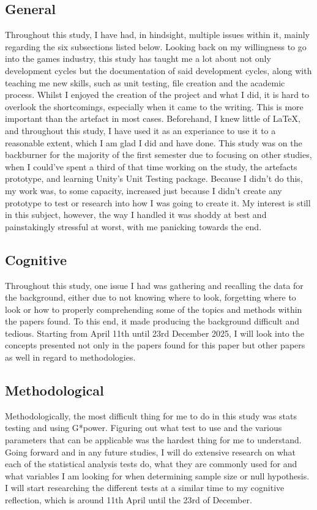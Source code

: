 \documentclass[conference]{IEEEtran}
\begin{document}
\subsection{General}
Throughout this study, I have had, in hindsight, multiple issues within it, mainly regarding the six subsections listed below. Looking back on my willingness to go into the games industry, this study has taught me a lot about not only development cycles but the documentation of said development cycles, along with teaching me new skills, such as unit testing, file creation and the academic process. Whilst I enjoyed the creation of the project and what I did, it is hard to overlook the shortcomings, especially when it came to the writing. This is more important than the artefact in most cases. Beforehand, I knew little of \LaTeX, and throughout this study, I have used it as an experiance to use it to a reasonable extent, which I am glad I did and have done. This study was on the backburner for the majority of the first semester due to focusing on other studies, when I could've spent a third of that time working on the study, the artefacts prototype, and learning Unity's Unit Testing package. Because I didn't do this, my work was, to some capacity, increased just because I didn't create any prototype to test or research into how I was going to create it. My interest is still in this subject, however, the way I handled it was shoddy at best and painstakingly stressful at worst, with me panicking towards the end.

\subsection{Cognitive}
Throughout this study, one issue I had was gathering and recalling the data for the background, either due to not knowing where to look, forgetting where to look or how to properly comprehending some of the topics and methods within the papers found. To this end, it made producing the background difficult and tedious. Starting from April 11th until 23rd December 2025, I will look into the concepts presented not only in the papers found for this paper but other papers as well in regard to methodologies. 

\subsection{Methodological}
Methodologically, the most difficult thing for me to do in this study was stats testing and using G*power. Figuring out what test to use and the various parameters that can be applicable was the hardest thing for me to understand. Going forward and in any future studies, I will do extensive research on what each of the statistical analysis tests do, what they are commonly used for and what variables I am looking for when determining sample size or null hypothesis. I will start researching the different tests at a similar time to my cognitive reflection, which is around 11th April until the 23rd of December.
\end{document}
